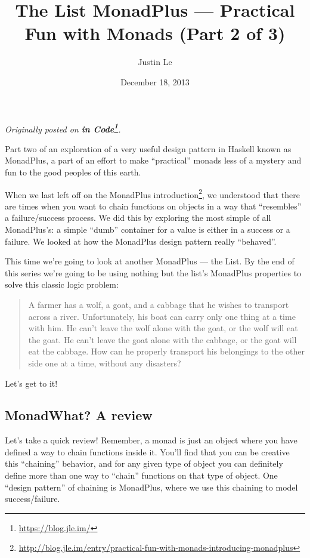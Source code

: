\documentclass[]{article}
\title{The List MonadPlus --- Practical Fun with Monads (Part 2 of 3)}
\author{Justin Le}
\date{December 18, 2013}
\renewcommand{\href}[2]{#2\footnote{\url{#1}}}
\begin{document}
\maketitle

\emph{Originally posted on \textbf{\href{https://blog.jle.im/}{in
Code}}.}

Part two of an exploration of a very useful design pattern in Haskell
known as MonadPlus, a part of an effort to make ``practical'' monads
less of a mystery and fun to the good peoples of this earth.

When we last left off on the
\href{http://blog.jle.im/entry/practical-fun-with-monads-introducing-monadplus}{MonadPlus
introduction}, we understood that there are times when you want to chain
functions on objects in a way that ``resembles'' a failure/success
process. We did this by exploring the most simple of all MonadPlus's: a
simple ``dumb'' container for a value is either in a success or a
failure. We looked at how the MonadPlus design pattern really
``behaved''.

This time we're going to look at another MonadPlus --- the List. By the
end of this series we're going to be using nothing but the list's
MonadPlus properties to solve this classic logic problem:

\begin{quote}
A farmer has a wolf, a goat, and a cabbage that he wishes to transport
across a river. Unfortunately, his boat can carry only one thing at a
time with him. He can't leave the wolf alone with the goat, or the wolf
will eat the goat. He can't leave the goat alone with the cabbage, or
the goat will eat the cabbage. How can he properly transport his
belongings to the other side one at a time, without any disasters?
\end{quote}

Let's get to it!

\subsection{MonadWhat? A review}\label{monadwhat-a-review}

Let's take a quick review! Remember, a monad is just an object where you
have defined a way to chain functions inside it. You'll find that you
can be creative this ``chaining'' behavior, and for any given type of
object you can definitely define more than one way to ``chain''
functions on that type of object. One ``design pattern'' of chaining is
MonadPlus, where we use this chaining to model success/failure.
\end{document}
